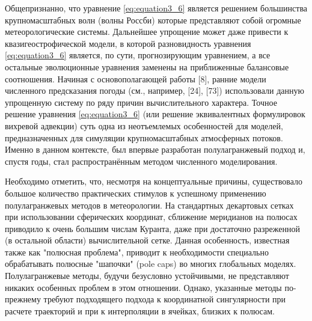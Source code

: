 Общепризнанно, что уравнение \eqref{eq:equation3_6} является решением большинства крупномасштабных волн (волны Россби) которые представляют собой огромные метеорологические системы. Дальнейшее упрощение может даже привести к квазигеострофической модели, в которой разновидность уравнения \eqref{eq:equation3_6} является, по сути, прогнозирующим уравнением, а все остальные эволюционные уравнения заменены на приближенные балансовые соотношения. Начиная с основополагающей работы [8], ранние модели численного предсказания погоды (см., например, [24], [73]) использовали данную упрощенную систему по ряду причин вычислительного характера. Точное решение уравнения \eqref{eq:equation3_6} (или решение эквивалентных формулировок вихревой адвекции) суть одна из неотъемлемых особенностей для моделей, предназначенных для симуляции крупномасштабных атмосферных потоков. Именно в данном контексте, был впервые разработан полулагранжевый подход и, спустя годы, стал распространённым методом численного моделирования.

Необходимо отметить, что, несмотря на концептуальные причины, существовало большое количество практических стимулов к успешному применению полулагранжевых методов в метеорологии. На стандартных декартовых сетках при использовании сферических координат, сближение меридианов на полюсах приводило к очень большим числам Куранта, даже при достаточно разреженной (в остальной области) вычислительной сетке. Данная особенность, известная также как "полюсная проблема", приводит к необходимости специально обрабатывать полюсные "шапочки" (pole caps) во многих глобальных моделях. Полулагранжевые методы, будучи безусловно устойчивыми, не представляют никаких особенных проблем в этом отношении. Однако, указанные методы по-прежнему требуют подходящего подхода к координатной сингулярности при расчете траекторий и при к интерполяции в ячейках, близких к полюсам.
